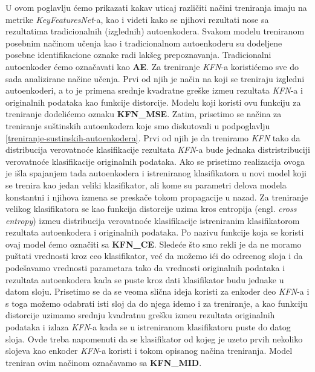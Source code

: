 \documentclass{article}
\begin{document}
	U ovom poglavlju \'cemo prikazati kakav uticaj razli\v citi na\v cini treniranja imaju na metrike \emph{KeyFeaturesNet}-a, kao i videti kako se njihovi rezultati nose sa rezultatima tradicionalnih (izglednih) autoenkodera. 
	Svakom modelu treniranom posebnim na\v cinom u\v cenja kao i tradicionalnom autoenkoderu su dodeljene posebne identifikacione oznake radi lak\v seg prepoznavanja. 
	Tradicionalni autoenkoder \'cemo ozna\v cavati kao \textbf{AE}. 
	Za treniranje \emph{KFN}-a koristi\'cemo sve do sada  analizirane na\v cine u\v cenja. 
	Prvi od njih je na\v cin na koji se treniraju izgledni autoenkoderi, a to je primena srednje kvadratne gre\v ske izme\dj u rezultata \emph{KFN}-a i originalnih podataka kao funkcije distorcije.
	Modelu koji koristi ovu funkciju za treniranje dodeli\'cemo oznaku \textbf{KFN\_MSE}.
	Zatim, prisetimo se na\v cina za treniranje su\v stinskih autoenkodera koje smo diskutovali u podpoglavlju \ref{treniranje-sustinskih-autoenkodera}.
	Prvi od njih je da treniramo \emph{KFN} tako da distribucija verovatno\'ce klasifikacije rezultata \emph{KFN}-a bude jednaka distristribuciji verovatno\'ce klasifikacije originalnih podataka.
	Ako se prisetimo realizacija ovoga je i\v sla spajanjem tada autoenkodera i istreniranog klasifikatora u novi model koji se trenira kao jedan veliki klasifikator, ali kome su parametri delova modela konstantni i njihova izmena se preska\v ce tokom propagacije u nazad.
	Za treniranje velikog klasifikatora se kao funkcija distorcije uzima kros entropija (engl. \emph{cross entropy}) izme\dj u distribucija verovatno\'ce klasifikacije istreniranim klasifikatorom rezultata autoenkodera i originalnih podataka. 
	Po nazivu funkcije koja se koristi ovaj model \'cemo ozna\v citi sa \textbf{KFN\_CE}. 
	Slede\'ce \v sto smo rekli je da ne moramo pu\v stati vrednosti kroz ceo klasifikator, ve\'c da mo\v zemo i\'ci do odre\dj enog sloja i da pode\v savamo vrednosti parametara tako da vrednosti originalnih podataka i rezultata autoenkodera kada se puste kroz dati klasifikator budu jednake u datom sloju.
	Prisetimo se da se veoma sli\v cna ideja koristi za enkoder deo \emph{KFN}-a i s toga mo\v zemo odabrati isti sloj da do njega idemo i za treniranje, a kao funkciju distorcije uzimamo srednju kvadratnu gre\v sku izme\dj u rezultata originalnih podataka i izlaza \emph{KFN}-a kada se u istreniranom klasifikatoru puste do datog sloja. 
	Ovde treba napomenuti da se klasifikator od kojeg je uzeto prvih nekoliko slojeva kao enkoder \emph{KFN}-a koristi i tokom opisanog na\v cina treniranja.
	Model treniran ovim na\v cinom ozna\v cavamo sa \textbf{KFN\_MID}.
\end{document}
